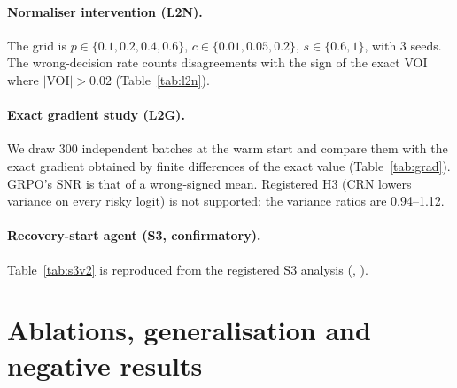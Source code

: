 \paragraph{Normaliser intervention (L2N).} The grid is $p\in\{0.1,0.2,0.4,0.6\}$, $c\in\{0.01,0.05,0.2\}$,
$s\in\{0.6,1\}$, with 3 seeds. The wrong-decision rate counts disagreements with the sign of the exact VOI where
$|$VOI$|>0.02$ (Table~\ref{tab:l2n}).

\begin{table}[h]\centering\small
\caption{Same estimator, different scale: from 16 independent rollouts in the same hidden state
(\texttt{indep\_world\_std}) or in fresh states (\texttt{indep\_task\_std}). Registered H4 is
supported.}\label{tab:l2n}\end{table}

\paragraph{Exact gradient study (L2G).} We draw 300 independent batches at the warm start and compare them with the
exact gradient obtained by finite differences of the exact value (Table~\ref{tab:grad}). GRPO's SNR is that of a
wrong-signed mean. Registered H3 (CRN lowers variance on every risky logit) is not supported: the variance ratios
are 0.94--1.12.

\begin{table}[h]\centering\small\resizebox{\columnwidth}{!}{}
\caption{Cosine of the mean gradient with the exact gradient, and per-logit SNR $|\text{mean}|/\text{sd}$ on the
verify logits (rich multi, $c=0.05$, $L_f=1$).}\label{tab:grad}\end{table}

\paragraph{Recovery-start agent (S3, confirmatory).} Table~\ref{tab:s3v2} is reproduced from the registered S3
analysis (, ).
\begin{table}[h]\centering\resizebox{\columnwidth}{!}{}
\caption{Registered S3 contrasts: seed-averaged difference [95\% task CI].}\label{tab:s3v2}\end{table}

\section{Ablations, generalisation and negative results}\label{app2:neg}


